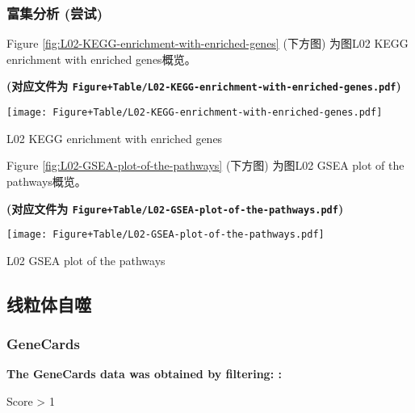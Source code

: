 \documentclass[
]{article}
\begin{document}
\hypertarget{ux5bccux96c6ux5206ux6790-ux5c1dux8bd5}{%
\subsubsection{富集分析 (尝试)}\label{ux5bccux96c6ux5206ux6790-ux5c1dux8bd5}}

Figure \ref{fig:L02-KEGG-enrichment-with-enriched-genes} (下方图) 为图L02 KEGG enrichment with enriched genes概览。

\textbf{(对应文件为 \texttt{Figure+Table/L02-KEGG-enrichment-with-enriched-genes.pdf})}

\def\@captype{figure}
\begin{center}
\texttt{[image: Figure+Table/L02-KEGG-enrichment-with-enriched-genes.pdf]}
\caption{L02 KEGG enrichment with enriched genes}\label{fig:L02-KEGG-enrichment-with-enriched-genes}
\end{center}

Figure \ref{fig:L02-GSEA-plot-of-the-pathways} (下方图) 为图L02 GSEA plot of the pathways概览。

\textbf{(对应文件为 \texttt{Figure+Table/L02-GSEA-plot-of-the-pathways.pdf})}

\def\@captype{figure}
\begin{center}
\texttt{[image: Figure+Table/L02-GSEA-plot-of-the-pathways.pdf]}
\caption{L02 GSEA plot of the pathways}\label{fig:L02-GSEA-plot-of-the-pathways}
\end{center}

\hypertarget{ux7ebfux7c92ux4f53ux81eaux566c}{%
\subsection{线粒体自噬}\label{ux7ebfux7c92ux4f53ux81eaux566c}}

\hypertarget{genecards}{%
\subsubsection{GeneCards}\label{genecards}}

\begin{center}\begin{tcolorbox}[colback=gray!10, colframe=gray!50, width=0.9\linewidth, arc=1mm, boxrule=0.5pt]
\textbf{
The GeneCards data was obtained by filtering:
:}

\vspace{0.5em}

    Score > 1

\vspace{2em}
\end{tcolorbox}
\end{center}
\end{document}
